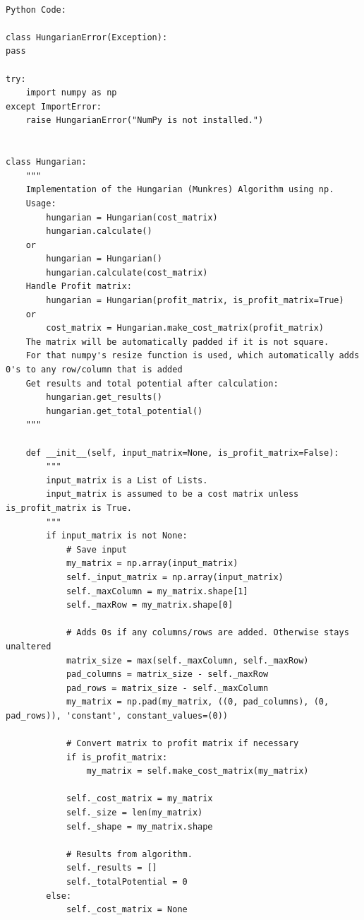 \documentclass[12pt, letterpaper, twoside]{book}
\begin{document}
\begin{lstlisting}    
	
Python Code:
	
class HungarianError(Exception):
pass

try:
    import numpy as np
except ImportError:
    raise HungarianError("NumPy is not installed.")


class Hungarian:
    """
    Implementation of the Hungarian (Munkres) Algorithm using np.
    Usage:
        hungarian = Hungarian(cost_matrix)
        hungarian.calculate()
    or
        hungarian = Hungarian()
        hungarian.calculate(cost_matrix)
    Handle Profit matrix:
        hungarian = Hungarian(profit_matrix, is_profit_matrix=True)
    or
        cost_matrix = Hungarian.make_cost_matrix(profit_matrix)
    The matrix will be automatically padded if it is not square.
    For that numpy's resize function is used, which automatically adds 0's to any row/column that is added
    Get results and total potential after calculation:
        hungarian.get_results()
        hungarian.get_total_potential()
    """

    def __init__(self, input_matrix=None, is_profit_matrix=False):
        """
        input_matrix is a List of Lists.
        input_matrix is assumed to be a cost matrix unless is_profit_matrix is True.
        """
        if input_matrix is not None:
            # Save input
            my_matrix = np.array(input_matrix)
            self._input_matrix = np.array(input_matrix)
            self._maxColumn = my_matrix.shape[1]
            self._maxRow = my_matrix.shape[0]

            # Adds 0s if any columns/rows are added. Otherwise stays unaltered
            matrix_size = max(self._maxColumn, self._maxRow)
            pad_columns = matrix_size - self._maxRow
            pad_rows = matrix_size - self._maxColumn
            my_matrix = np.pad(my_matrix, ((0, pad_columns), (0, pad_rows)), 'constant', constant_values=(0))

            # Convert matrix to profit matrix if necessary
            if is_profit_matrix:
                my_matrix = self.make_cost_matrix(my_matrix)

            self._cost_matrix = my_matrix
            self._size = len(my_matrix)
            self._shape = my_matrix.shape

            # Results from algorithm.
            self._results = []
            self._totalPotential = 0
        else:
            self._cost_matrix = None


\end{lstlisting}
\end{document}
